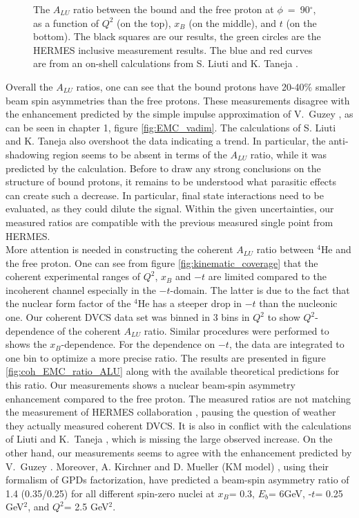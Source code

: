 \begin{figure}[tp]
\caption{ The $A_{LU}$ ratio between the bound and the free proton at 
   $\phi$~=~90$^{\circ}$, as a function of $Q^2$ (on the top), $x_B$ (on the 
   middle), and $t$ (on the bottom). The black squares are our results, the 
   green circles are the HERMES inclusive measurement \cite{HERMES_BSA} 
   results.  The blue and red curves are from an on-shell calculations from S. 
Liuti and K. Taneja \cite{simonetta_2}.} \label{fig:incoh_EMC_ratio_ALU_proton}
\end{figure}

Overall the $A_{LU}$ ratios, one can see that the bound protons 
have 20-40$\%$ smaller beam spin asymmetries than the free protons. These measurements 
disagree with the enhancement predicted by the simple impulse approximation of 
V.~Guzey \cite{EMC_vadim_2}, as can be seen in chapter 1, figure 
\ref{fig:EMC_vadim}. The calculations of S. Liuti and K. Taneja \cite{simonetta_2}
also overshoot the data indicating a trend. In particular, the 
anti-shadowing region seems to be absent in terms of the $A_{LU}$ ratio, while
it was predicted by the calculation. Before to draw any strong conclusions on the 
structure of bound protons, it remains to be understood what parasitic
effects can create such a decrease. In particular, final state interactions need
to be evaluated, as they could dilute the signal.  Within the given 
uncertainties, our measured ratios are compatible with the previous measured 
single point from HERMES.\\


 More attention is needed in constructing the coherent $A_{LU}$ ratio between 
 $^4$He and the free proton. One can see from figure 
 \ref{fig:kinematic_coverage} that the coherent experimental ranges of $Q^2$, 
 $x_{B}$ and $-t$ are limited compared to the incoherent channel especially in 
 the $-t$-domain. The latter is due to the fact that the nuclear form factor of 
 the $^4$He has a steeper drop in $-t$ than the nucleonic one. Our coherent 
 DVCS data set was binned in 3 bins in $Q^{2}$ to show
 $Q^{2}$-dependence of the coherent $A_{LU}$ ratio.  Similar procedures were 
 performed to shows the $x_B$-dependence. For the dependence on $-t$, the data 
 are integrated to one bin to optimize a more precise ratio. The results are 
 presented in figure \ref{fig:coh_EMC_ratio_ALU} along with the available 
 theoretical predictions for this ratio. Our measurements shows a nuclear 
 beam-spin asymmetry enhancement compared to the free proton. 
 The measured ratios are not matching the measurement of 
 HERMES collaboration \cite{HERMES_BSA}, pausing the question of weather they
 actually measured coherent DVCS. It is also in conflict with the calculations 
 of Liuti and K.~Taneja \cite{simonetta_2}, which is missing the large observed 
 increase. On the other hand, our measurements seems to agree with the 
 enhancement predicted by V.~Guzey \cite{EMC_vadim_4}.  Moreover, A.  Kirchner 
 and D. Mueller (KM model) \cite{Kir}, using their formalism of GPDs 
 factorization, have predicted a beam-spin asymmetry ratio of 1.4 (0.35/0.25) 
 for all different spin-zero nuclei at $x_{B}$= 0.3, $E_{b}$= 6GeV, -$t$= 0.25 
 GeV$^2$, and $Q^2$= 2.5 GeV$^2$.  \\



